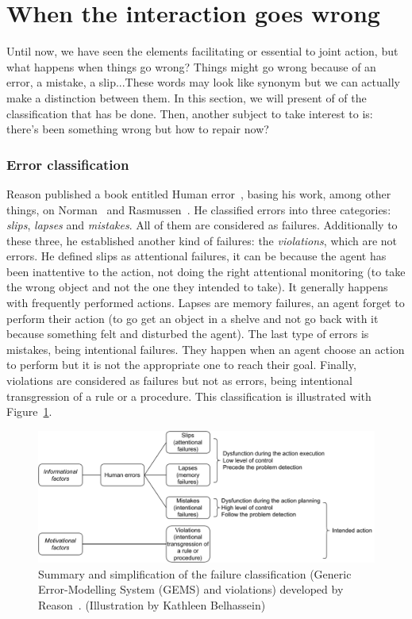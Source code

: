 \documentclass[a4paper,11pt,twoside]{StyleThese}
\begin{document}
\section{When the interaction goes wrong}\label{chap1:sec:failures}
Until now, we have seen the elements facilitating or essential to joint action, but what happens when things go wrong? Things might go wrong because of an error, a mistake, a slip...These words may look like synonym but we can actually make a distinction between them. In this section, we will present of of the classification that has be done. Then, another subject to take interest to is: there's been something wrong but how to repair now?

\subsubsection{Error classification}
Reason published a book entitled Human error~\cite{reason_1990_human}, basing his work, among other things, on Norman~\cite{norman_1981_categorization} and Rasmussen~\cite{rasmussen_1982_human}. He classified errors into three categories: \emph{slips}, \emph{lapses} and \emph{mistakes}. All of them are considered as failures. Additionally to these three, he established another kind of failures: the \emph{violations}, which are not errors. He defined slips as attentional failures, \ie it can be because the agent has been inattentive to the action, not doing the right attentional monitoring (\eg to take the wrong object and not the one they intended to take). It generally happens with frequently performed actions. Lapses are memory failures, \ie an agent forget to perform their action (\eg to go get an object in a shelve and not go back with it because something felt and disturbed the agent). The last type of errors is mistakes, being intentional failures. They happen when an agent choose an action to perform but it is not the appropriate one to reach their goal. Finally, violations are considered as failures but not as errors, being intentional transgression of a rule or a procedure. This classification is illustrated with Figure~\ref{chap1:fig:err}.

 \begin{figure}[!ht]
 	\includegraphics[width=\linewidth]{figures/chapter1/reason-errors.pdf}
 	\caption{Summary and simplification of the failure classification (Generic Error-Modelling System (GEMS) and violations) developed by Reason~\cite{reason_1990_human}. (Illustration by Kathleen Belhassein)}
 	\label{chap1:fig:err}
 \end{figure}
\end{document}
